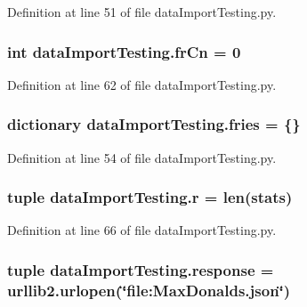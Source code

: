 Definition at line 51 of file data\-Import\-Testing.\-py.

\hypertarget{namespacedataImportTesting_a3d7d25d33bb5b2b1ff1a46c7c2fc321c}{
\subsubsection[{fr\-Cn}]{\setlength{\rightskip}{0pt plus 5cm}int data\-Import\-Testing.\-fr\-Cn = 0}}\label{namespacedataImportTesting_a3d7d25d33bb5b2b1ff1a46c7c2fc321c}


Definition at line 62 of file data\-Import\-Testing.\-py.

\hypertarget{namespacedataImportTesting_a9c0b1c57b42b00d8f28ad6e1d95a7b5d}{
\subsubsection[{fries}]{\setlength{\rightskip}{0pt plus 5cm}dictionary data\-Import\-Testing.\-fries = \{\}}}\label{namespacedataImportTesting_a9c0b1c57b42b00d8f28ad6e1d95a7b5d}


Definition at line 54 of file data\-Import\-Testing.\-py.

\hypertarget{namespacedataImportTesting_a5be936dd65a231ffe248664d9904f718}{
\subsubsection[{r}]{\setlength{\rightskip}{0pt plus 5cm}tuple data\-Import\-Testing.\-r = len({\bf stats})}}\label{namespacedataImportTesting_a5be936dd65a231ffe248664d9904f718}


Definition at line 66 of file data\-Import\-Testing.\-py.

\hypertarget{namespacedataImportTesting_a95c87352eebd9f60ccf454136da78291}{
\subsubsection[{response}]{\setlength{\rightskip}{0pt plus 5cm}tuple data\-Import\-Testing.\-response = urllib2.\-urlopen(\char`\"{}file\-:\-Max\-Donalds.\-json\char`\"{})}}\label{namespacedataImportTesting_a95c87352eebd9f60ccf454136da78291}


